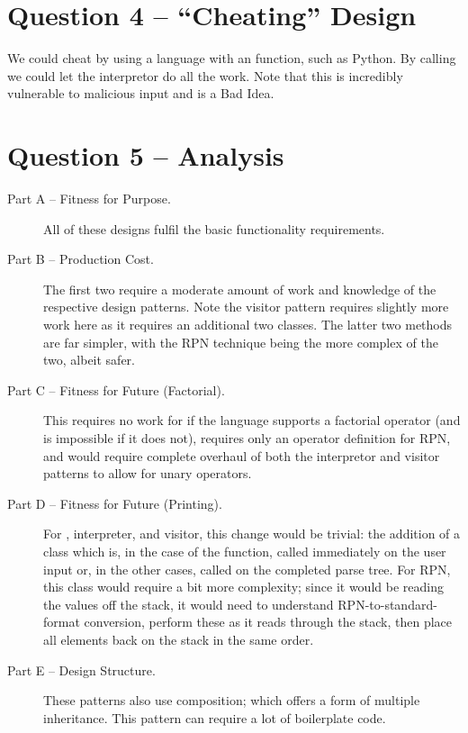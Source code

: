 \documentclass[12pt]{article}
\begin{document}
\section{Question 4 -- ``Cheating'' Design}
We could cheat by using a language with an  function, such as Python. By calling  we could let the interpretor do all the work. Note that this is incredibly vulnerable to malicious input and is a Bad Idea\texttrademark.

\section{Question 5 -- Analysis}
\begin{description}
\item[Part A -- Fitness for Purpose.] All of these designs fulfil the basic functionality requirements.
\item[Part B -- Production Cost.] The first two require a moderate amount of work and knowledge of the respective design patterns. Note the visitor pattern requires slightly more work here as it requires an additional two classes. The latter two methods are far simpler, with the RPN technique being the more complex of the two, albeit safer.
\item[Part C -- Fitness for Future (Factorial).] This requires no work for  if the language supports a factorial operator (and is impossible if it does not), requires only an operator definition for RPN, and would require complete overhaul of both the interpretor and visitor patterns to allow for unary operators.
\item[Part D -- Fitness for Future (Printing).] For , interpreter, and visitor, this change would be trivial: the addition of a  class which is, in the case of the  function, called immediately on the user input or, in the other cases, called on the completed parse tree. For RPN, this class would require a bit more complexity; since it would be reading the values off the stack, it would need to understand RPN-to-standard-format conversion, perform these as it reads through the stack, then place all elements back on the stack in the same order.
\item[Part E -- Design Structure.] These patterns also use composition; which offers a form of multiple inheritance. This pattern can require a lot of boilerplate code.
\end{description}
\end{document}
